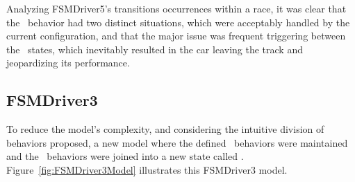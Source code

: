 Analyzing FSMDriver5's transitions occurrences within a race, it was clear that the \recovery~behavior had two distinct situations, which were acceptably handled by the current configuration, and that the major issue was frequent triggering between the \racing~states, which inevitably resulted in the car leaving the track and jeopardizing its performance.

\subsection{FSMDriver3}%
To reduce the model's complexity, and considering the intuitive division of behaviors proposed, a new model where the defined \recovery~behaviors were maintained and the \racing~behaviors were joined into a new state called \IT. Figure~\ref{fig:FSMDriver3Model} illustrates this FSMDriver3 model.

